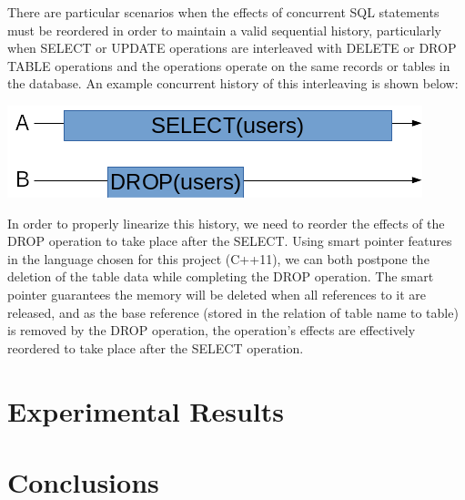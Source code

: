 \documentclass[letter,11pt]{article}
\begin{document}
\newpage
There are particular scenarios when the effects of concurrent SQL statements must be reordered
in order to maintain a valid sequential history, particularly when SELECT or UPDATE operations
are interleaved with DELETE or DROP TABLE operations and the operations operate on the same 
records or tables in the database. An example concurrent history of this interleaving is shown below:
\par\vspace{\baselineskip}
\includegraphics{concurrent_history_1}
\par\vspace{\baselineskip}
In order to properly linearize this history, we need to reorder the effects of the DROP operation
to take place after the SELECT. Using smart pointer features in the language chosen for this project
(C++11), we can both postpone the deletion of the table data while completing the DROP operation.
The smart pointer guarantees the memory will be deleted when all references to it are released, and
as the base reference (stored in the relation of table name to table) is removed by the DROP operation,
the operation's effects are effectively reordered to take place after the SELECT operation.

\section{Experimental Results}

\section{Conclusions}

\newpage


\newpage
\end{document}
